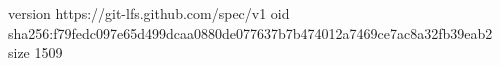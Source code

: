 version https://git-lfs.github.com/spec/v1
oid sha256:f79fedc097e65d499dcaa0880de077637b7b474012a7469ce7ac8a32fb39eab2
size 1509
